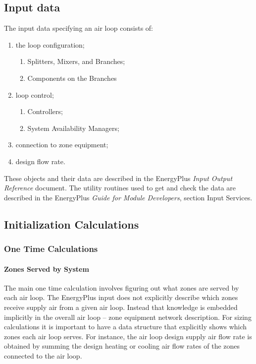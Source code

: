 \subsection{Input data}\label{input-data}

The input data specifying an air loop consists of:

\begin{enumerate}
\def\labelenumi{\arabic{enumi}.}
\def\labelenumii{\alph{enumii}.}
\tightlist
\item
  the loop configuration;
    \begin{enumerate}
    \item
      Splitters, Mixers, and Branches;
    \item
      Components on the Branches
    \end{enumerate}

\item
  loop control;

    \begin{enumerate}
    \item
    Controllers;
    \item
    System Availability Managers;
    \end{enumerate}
\item
  connection to zone equipment;
\item
  design flow rate.
\end{enumerate}

These objects and their data are described in the EnergyPlus \emph{Input Output Reference} document. The utility routines used to get and check the data are described in the EnergyPlus \emph{Guide for Module Developers}, section Input Services.

\subsection{Initialization Calculations}\label{initialization-calculations}

\subsubsection{One Time Calculations}\label{one-time-calculations}

\paragraph{Zones Served by System}\label{zones-served-by-system}

The main one time calculation involves figuring out what zones are served by each air loop. The EnergyPlus input does not explicitly describe which zones receive supply air from a given air loop. Instead that knowledge is embedded implicitly in the overall air loop -- zone equipment network description. For sizing calculations it is important to have a data structure that explicitly shows which zones each air loop serves. For instance, the air loop design supply air flow rate is obtained by summing the design heating or cooling air flow rates of the zones connected to the air loop.

